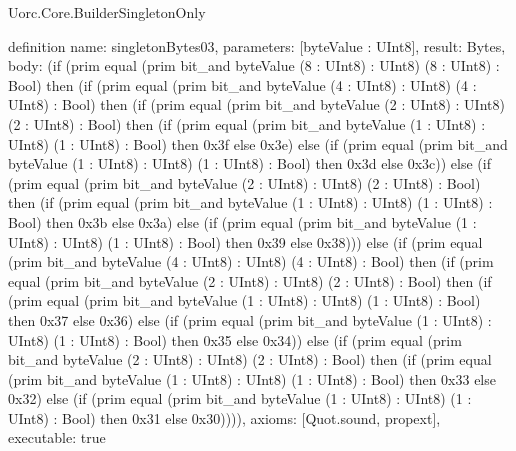 \begin{lexlean}{Uorc.Core.BuilderSingletonOnly}
\begin{semanticmodule}
definition{
  name: singletonBytes03,
  parameters: [byteValue : UInt8],
  result: Bytes,
  body: (if (prim equal (prim bit_and byteValue (8 : UInt8) : UInt8) (8 : UInt8) : Bool) then (if (prim equal (prim bit_and byteValue (4 : UInt8) : UInt8) (4 : UInt8) : Bool) then (if (prim equal (prim bit_and byteValue (2 : UInt8) : UInt8) (2 : UInt8) : Bool) then (if (prim equal (prim bit_and byteValue (1 : UInt8) : UInt8) (1 : UInt8) : Bool) then 0x3f else 0x3e) else (if (prim equal (prim bit_and byteValue (1 : UInt8) : UInt8) (1 : UInt8) : Bool) then 0x3d else 0x3c)) else (if (prim equal (prim bit_and byteValue (2 : UInt8) : UInt8) (2 : UInt8) : Bool) then (if (prim equal (prim bit_and byteValue (1 : UInt8) : UInt8) (1 : UInt8) : Bool) then 0x3b else 0x3a) else (if (prim equal (prim bit_and byteValue (1 : UInt8) : UInt8) (1 : UInt8) : Bool) then 0x39 else 0x38))) else (if (prim equal (prim bit_and byteValue (4 : UInt8) : UInt8) (4 : UInt8) : Bool) then (if (prim equal (prim bit_and byteValue (2 : UInt8) : UInt8) (2 : UInt8) : Bool) then (if (prim equal (prim bit_and byteValue (1 : UInt8) : UInt8) (1 : UInt8) : Bool) then 0x37 else 0x36) else (if (prim equal (prim bit_and byteValue (1 : UInt8) : UInt8) (1 : UInt8) : Bool) then 0x35 else 0x34)) else (if (prim equal (prim bit_and byteValue (2 : UInt8) : UInt8) (2 : UInt8) : Bool) then (if (prim equal (prim bit_and byteValue (1 : UInt8) : UInt8) (1 : UInt8) : Bool) then 0x33 else 0x32) else (if (prim equal (prim bit_and byteValue (1 : UInt8) : UInt8) (1 : UInt8) : Bool) then 0x31 else 0x30)))),
  axioms: [Quot.sound, propext],
  executable: true
}


\end{semanticmodule}
\end{lexlean}
